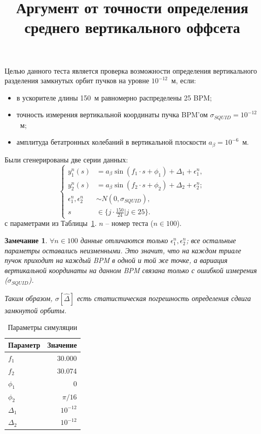 \documentclass[12pt]{report}
\title{Аргумент от точности определения среднего вертикального оффсета}
\newcommand{\sigSQUID}{\sigma_{SQUID}}
\newcommand{\Ab}{a_{\beta}}
\newcommand{\ntrl}{n}
\newtheorem{rmk}{Замечание}
\begin{document}
	\maketitle
	
Целью данного теста является проверка возможности определения вертикального разделения замкнутых орбит пучков на уровне $10^{-12}$~м, если:
\begin{itemize}
	\item в ускорителе длины 150~м равномерно распределены 25 BPM;
	\item точность измерения вертикальной координаты пучка BPM'ом $\sigSQUID=10^{-12}$~м;
	\item амплитуда бетатронных колебаний в вертикальной плоскости $\Ab=10^{-6}$~м.
\end{itemize}

Были сгенерированы две серии данных:
\begin{equation}\label{eq:data}
	\begin{cases}
		y_1^{\ntrl}(s) &= \Ab\sin(f_1\cdot s + \phi_1) + \Delta_1 + \epsilon_1^{\ntrl},\\
		y_2^{\ntrl}(s) &= \Ab\sin(f_2\cdot s + \phi_2) + \Delta_2 + \epsilon_2^{\ntrl};\\
		\epsilon_1^{\ntrl},\epsilon_2^{\ntrl}&\sim N(0,\sigSQUID), \\
		s &\in \{j\cdot\frac{150}{24}| j \in 25\}.
	\end{cases}
\end{equation}
с параметрами из Таблицы~\ref{tbl:sim_param}. $\ntrl$ -- номер теста ($\ntrl\in100$).

\begin{rmk}
	$\forall\ntrl\in100$ данные отличаются только $\epsilon_1^{\ntrl},\epsilon_2^{\ntrl}$; все остальные параметры оставались неизменными. Это значит, что на каждом триале пучок приходит на каждый BPM в одной и той же точке, а вариация вертикальной координаты на данном BPM связана только с ошибкой измерения ($\sigma_{SQUID}$).
	
	Таким образом, $\sigma[\hat{\Delta}]$ есть \emph{статистическая} погрешность определения сдвига замкнутой орбиты.
\end{rmk}

\begin{table}[h]\centering
	\caption{Параметры симуляции\label{tbl:sim_param}}
	\begin{tabular}{lr}\hline
		Параметр & Значение \\
		\hline
		$f_1$ & 30.000 \\
		$f_2$ & 30.074\\
		$\phi_1$ & 0 \\
		$\phi_2$ & $\pi/16$ \\
		$\Delta_1$ & $10^{-12}$ \\
		$\Delta_2$ & $10^{-12}$\\
		 \hline
	\end{tabular}
\end{table}
\end{document}
